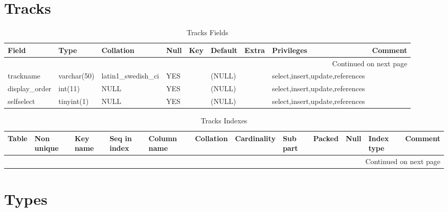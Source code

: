 \documentclass[tablesignature,landscape]{scrartcl}
\begin{document}
\section{Tracks}
\label{sec-32}


\begin{longtable}{|l|l|l|l|l|l|l|l|l|}
\caption{Tracks Fields} \label{tbl:tracksfields}\\
\hline
 Field             &  Type         &  Collation                &  Null  &  Key  &  Default  &  Extra              &  Privileges                       &  Comment \\
\hline
\endhead
\hline\multicolumn{9}{r}{Continued on next page}\
\endfoot
\endlastfoot
\hline
 trackid           &  int(11)      &  NULL                     &        &  PRI  &  (NULL)   &  auto\_{}increment  &  select,insert,update,references  &           \\
 trackname         &  varchar(50)  &  latin1\_{}swedish\_{}ci  &  YES   &       &  (NULL)   &                     &  select,insert,update,references  &           \\
 display\_{}order  &  int(11)      &  NULL                     &  YES   &       &  (NULL)   &                     &  select,insert,update,references  &           \\
 selfselect        &  tinyint(1)   &  NULL                     &  YES   &       &  (NULL)   &                     &  select,insert,update,references  &           \\
\hline
\end{longtable}


\begin{longtable}{|l|l|l|l|l|l|l|l|l|l|l|l|}
\caption{Tracks Indexes} \label{tbl:trackssindexes}\\
\hline
 Table   &  Non unique  &  Key name  &  Seq in index  &  Column name  &  Collation  &  Cardinality  &  Sub part  &  Packed  &  Null  &  Index type  &  Comment \\
\hline
\endhead
\hline\multicolumn{12}{r}{Continued on next page}\
\endfoot
\endlastfoot
\hline
 Tracks  &           0  &  PRIMARY   &             1  &  trackid      &  A          &           22  &  (NULL)    &  (NULL)  &        &  BTREE       &           \\
\hline
\end{longtable}
\section{Types}
\label{sec-33}
\end{document}
